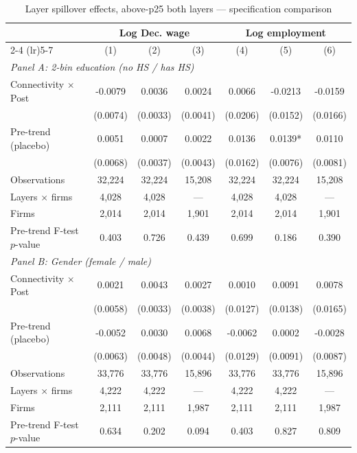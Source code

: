 \begin{table}[H]
\centering
\caption{Layer spillover effects, above-p25 both layers --- specification comparison}
\label{tab:layer_specs_abvp25}
\scriptsize
\begin{threeparttable}
\begin{tabular}{lcccccc}
\toprule\toprule
 & \multicolumn{3}{c}{Log Dec. wage} & \multicolumn{3}{c}{Log employment} \\
\cmidrule(lr){2-4} \cmidrule(lr){5-7}
 & (1) & (2) & (3) & (4) & (5) & (6) \\
\midrule
\multicolumn{7}{l}{\textit{Panel A: 2-bin education (no HS / has HS)}} \\
\quad Connectivity $\times$ Post & -0.0079 & 0.0036 & 0.0024 & 0.0066 & -0.0213 & -0.0159 \\
 & (0.0074) & (0.0033) & (0.0041) & (0.0206) & (0.0152) & (0.0166) \\
\quad Pre-trend (placebo) & 0.0051 & 0.0007 & 0.0022 & 0.0136 & 0.0139* & 0.0110 \\
 & (0.0068) & (0.0037) & (0.0043) & (0.0162) & (0.0076) & (0.0081) \\
\quad Observations & 32,224 & 32,224 & 15,208 & 32,224 & 32,224 & 15,208 \\
\quad Layers $\times$ firms & 4,028 & 4,028 & --- & 4,028 & 4,028 & --- \\
\quad Firms & 2,014 & 2,014 & 1,901 & 2,014 & 2,014 & 1,901 \\
\quad Pre-trend F-test $p$-value & 0.403 & 0.726 & 0.439 & 0.699 & 0.186 & 0.390 \\[6pt]
\multicolumn{7}{l}{\textit{Panel B: Gender (female / male)}} \\
\quad Connectivity $\times$ Post & 0.0021 & 0.0043 & 0.0027 & 0.0010 & 0.0091 & 0.0078 \\
 & (0.0058) & (0.0033) & (0.0038) & (0.0127) & (0.0138) & (0.0165) \\
\quad Pre-trend (placebo) & -0.0052 & 0.0030 & 0.0068 & -0.0062 & 0.0002 & -0.0028 \\
 & (0.0063) & (0.0048) & (0.0044) & (0.0129) & (0.0091) & (0.0087) \\
\quad Observations & 33,776 & 33,776 & 15,896 & 33,776 & 33,776 & 15,896 \\
\quad Layers $\times$ firms & 4,222 & 4,222 & --- & 4,222 & 4,222 & --- \\
\quad Firms & 2,111 & 2,111 & 1,987 & 2,111 & 2,111 & 1,987 \\
\quad Pre-trend F-test $p$-value & 0.634 & 0.202 & 0.094 & 0.403 & 0.827 & 0.809 \\[6pt]

\end{tabular}
\end{threeparttable}
\end{table}
